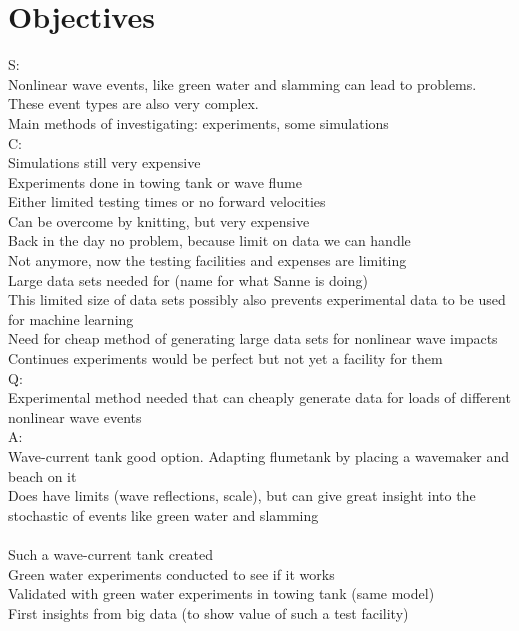 

\chapter{Objectives}
\label{sec:objective}
S: \\
Nonlinear wave events, like green water and slamming can lead to problems. \\
These event types are also very complex. \\
Main methods of investigating: experiments, some simulations \\
C: \\
Simulations still very expensive \\
Experiments done in towing tank or wave flume \\
Either limited testing times or no forward velocities \\
Can be overcome by knitting, but very expensive \\
Back in the day no problem, because limit on data we can handle \\
Not anymore, now the testing facilities and expenses are limiting \\
Large data sets needed for (name for what Sanne is doing)\\
This limited size of data sets possibly also prevents experimental data to be used for machine learning \\
Need for cheap method of generating large data sets for nonlinear wave impacts \\
Continues experiments would be perfect but not yet a facility for them\\
Q:\\
Experimental method needed that can cheaply generate data for loads of different nonlinear wave events \\
A:\\
Wave-current tank good option. Adapting flumetank by placing a wavemaker and beach on it\\
Does have limits (wave reflections, scale), but can give great insight into the stochastic of events like green water and slamming \\
\\


Such a wave-current tank created \\
Green water experiments conducted to see if it works \\
Validated with green water experiments in towing tank (same model) \\


First insights from big data (to show value of such a test facility)\\
